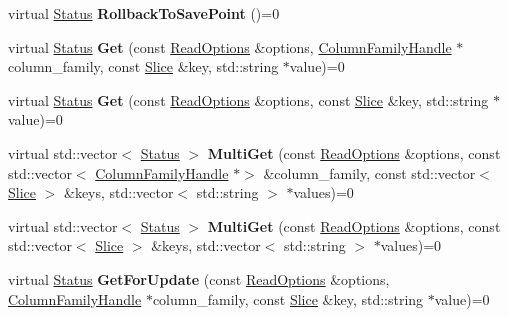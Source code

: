 \begin{DoxyCompactItemize}
\item 
virtual \hyperlink{classrocksdb_1_1Status}{Status} {\bfseries Rollback\+To\+Save\+Point} ()=0\hypertarget{classrocksdb_1_1Transaction_a1fc0716b763fea5c2bb7ac9201f1a493}{}\label{classrocksdb_1_1Transaction_a1fc0716b763fea5c2bb7ac9201f1a493}

\item 
virtual \hyperlink{classrocksdb_1_1Status}{Status} {\bfseries Get} (const \hyperlink{structrocksdb_1_1ReadOptions}{Read\+Options} \&options, \hyperlink{classrocksdb_1_1ColumnFamilyHandle}{Column\+Family\+Handle} $\ast$column\+\_\+family, const \hyperlink{classrocksdb_1_1Slice}{Slice} \&key, std\+::string $\ast$value)=0\hypertarget{classrocksdb_1_1Transaction_abfb171f3c4e47ff910d272db7e49e121}{}\label{classrocksdb_1_1Transaction_abfb171f3c4e47ff910d272db7e49e121}

\item 
virtual \hyperlink{classrocksdb_1_1Status}{Status} {\bfseries Get} (const \hyperlink{structrocksdb_1_1ReadOptions}{Read\+Options} \&options, const \hyperlink{classrocksdb_1_1Slice}{Slice} \&key, std\+::string $\ast$value)=0\hypertarget{classrocksdb_1_1Transaction_aea858445f7925a7bdd2fc6cf28616c73}{}\label{classrocksdb_1_1Transaction_aea858445f7925a7bdd2fc6cf28616c73}

\item 
virtual std\+::vector$<$ \hyperlink{classrocksdb_1_1Status}{Status} $>$ {\bfseries Multi\+Get} (const \hyperlink{structrocksdb_1_1ReadOptions}{Read\+Options} \&options, const std\+::vector$<$ \hyperlink{classrocksdb_1_1ColumnFamilyHandle}{Column\+Family\+Handle} $\ast$$>$ \&column\+\_\+family, const std\+::vector$<$ \hyperlink{classrocksdb_1_1Slice}{Slice} $>$ \&keys, std\+::vector$<$ std\+::string $>$ $\ast$values)=0\hypertarget{classrocksdb_1_1Transaction_ac633eafa7f47a630d405b787125854de}{}\label{classrocksdb_1_1Transaction_ac633eafa7f47a630d405b787125854de}

\item 
virtual std\+::vector$<$ \hyperlink{classrocksdb_1_1Status}{Status} $>$ {\bfseries Multi\+Get} (const \hyperlink{structrocksdb_1_1ReadOptions}{Read\+Options} \&options, const std\+::vector$<$ \hyperlink{classrocksdb_1_1Slice}{Slice} $>$ \&keys, std\+::vector$<$ std\+::string $>$ $\ast$values)=0\hypertarget{classrocksdb_1_1Transaction_afd79096f7e66b033f827dee2eb337170}{}\label{classrocksdb_1_1Transaction_afd79096f7e66b033f827dee2eb337170}

\item 
virtual \hyperlink{classrocksdb_1_1Status}{Status} {\bfseries Get\+For\+Update} (const \hyperlink{structrocksdb_1_1ReadOptions}{Read\+Options} \&options, \hyperlink{classrocksdb_1_1ColumnFamilyHandle}{Column\+Family\+Handle} $\ast$column\+\_\+family, const \hyperlink{classrocksdb_1_1Slice}{Slice} \&key, std\+::string $\ast$value)=0\hypertarget{classrocksdb_1_1Transaction_a277506a2697c5b1b5e5e482b32a1ec67}{}\label{classrocksdb_1_1Transaction_a277506a2697c5b1b5e5e482b32a1ec67}


\end{DoxyCompactItemize}
